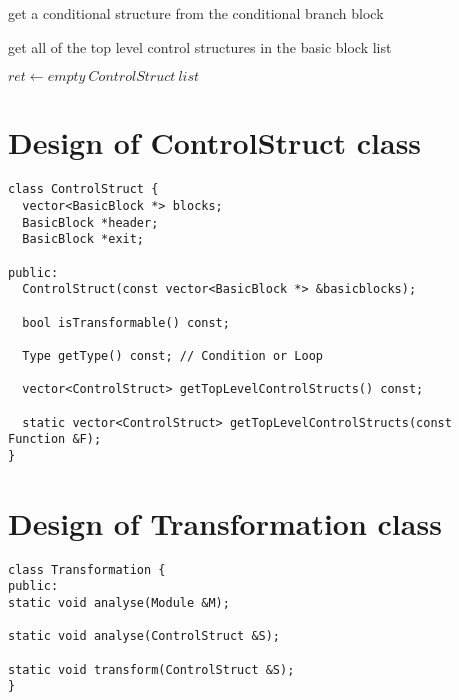 \documentclass{article}
\begin{document}
\begin{algorithm}
  \caption{get a conditional structure from the conditional branch block}
  \begin{algorithmic}[1]
       
    \EndFunction
  \end{algorithmic}
\end{algorithm}

\begin{algorithm}
  \caption{get all of the top level control structures in the basic block list}
  \begin{algorithmic}[1]
      \State $ret \gets empty\ ControlStruct\ list$
          \Else
          \EndIf
         
        \EndIf
      \EndFor
    \EndFunction
  \end{algorithmic}
\end{algorithm}

\FloatBarrier
\section*{Design of ControlStruct class}
\begin{lstlisting}
class ControlStruct {
  vector<BasicBlock *> blocks;
  BasicBlock *header;
  BasicBlock *exit;

public:
  ControlStruct(const vector<BasicBlock *> &basicblocks);

  bool isTransformable() const;

  Type getType() const; // Condition or Loop

  vector<ControlStruct> getTopLevelControlStructs() const;

  static vector<ControlStruct> getTopLevelControlStructs(const Function &F);
}
\end{lstlisting}

\section*{Design of Transformation class}
\begin{lstlisting}
class Transformation {
public:
static void analyse(Module &M);

static void analyse(ControlStruct &S);

static void transform(ControlStruct &S);
}
\end{lstlisting}
\end{document}
